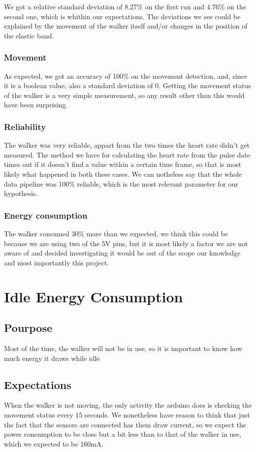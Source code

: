 			We got a relative standard deviation of 8.27\% on the first run and 4.76\% on the second one, which is whithin our expectations. The deviations we see could be explained by the movement of the walker itself and/or changes in the position of the elastic band.

		\subsubsection{Movement}
			As expected, we got an accuracy of 100\% on the movement detection, and, since it is a boolean value, also a standard deviation of 0. Getting the movement status of the walker is a very simple measurement, so any result other than this would have been surprising.

		\subsubsection{Reliability}
			The walker was very reliable, appart from the two times the heart rate didn't get measured. The method we have for calculating the heart rate from the pulse date times out if it doesn't find a value within a certain time frame, so that is most likely what happened in both these cases. We can notheless say that the whole data pipeline was 100\% reliable, which is the most relevant parameter for our hypothesis.

		\subsubsection{Energy consumption}
			The walker consumed 30\% more than we expected, we think this could be because we are using two of the 5V pins, but it is most likely a factor we are not aware of and decided investigating it would be out of the scope our knowledge and most importantly this project.

\section{Idle Energy Consumption}

	\subsection{Pourpose}
		Most of the time, the walker will not be in use, so it is important to know how much energy it draws while idle
	\subsection{Expectations}
		When the walker is not moving, the only activity the arduino does is checking the movement status every 15 seconds. We nonetheless have reason to think that just the fact that the sensors are connected has them draw current, so we expect the power consumption to be close but a bit less than to that of the walker in use, which we expected to be 160mA.
